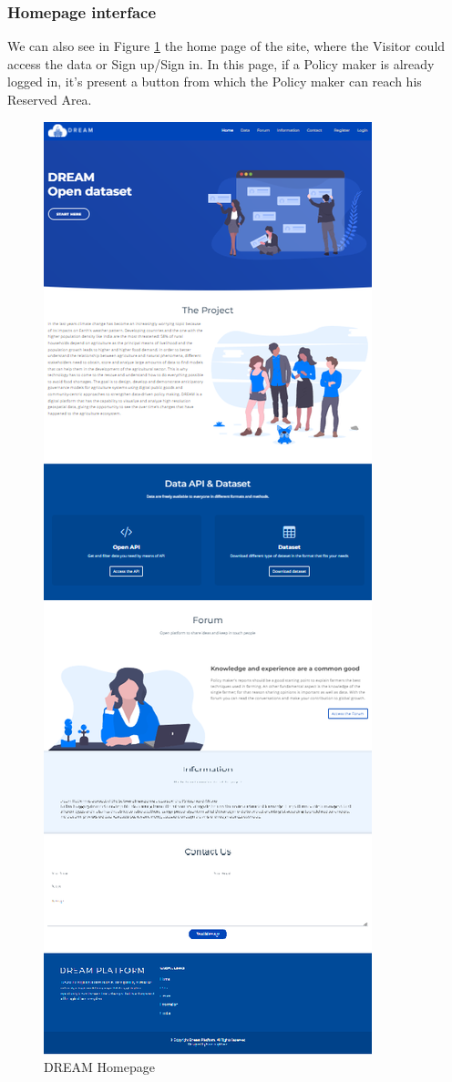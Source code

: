 \subsubsection{Homepage interface}
We can also see in Figure \ref{fig:homepage} the home page of the site, where the Visitor could access the data or Sign up/Sign in. In this page, if a Policy maker is already logged in, it's present a button from which the Policy maker can reach his Reserved Area.
\begin{figure}[h!]
    \centering
    \includegraphics[scale=0.55]{images/interfaces/home.png}
    \caption{DREAM Homepage}
    \label{fig:homepage}
\end{figure}
\FloatBarrier
